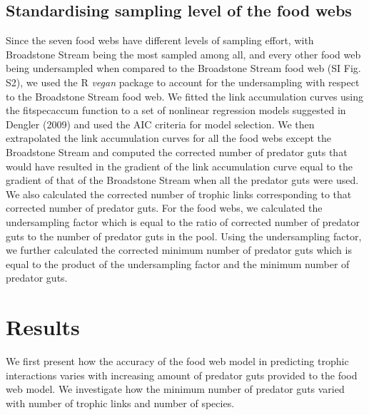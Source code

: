 \documentclass{article}
\begin{document}
\hypertarget{standardising-sampling-level-of-the-food-webs}{%
\subsection{Standardising sampling level of the food
webs}\label{standardising-sampling-level-of-the-food-webs}}

Since the seven food webs have different levels of sampling effort, with
Broadstone Stream being the most sampled among all, and every other food
web being undersampled when compared to the Broadstone Stream food web
(SI Fig. S2), we used the R \emph{vegan} package to account for the
undersampling with respect to the Broadstone Stream food web. We fitted
the link accumulation curves using the fitspecaccum function to a set of
nonlinear regression models suggested in Dengler (2009) and used the AIC
criteria for model selection. We then extrapolated the link accumulation
curves for all the food webs except the Broadstone Stream and computed
the corrected number of predator guts that would have resulted in the
gradient of the link accumulation curve equal to the gradient of that of
the Broadstone Stream when all the predator guts were used. We also
calculated the corrected number of trophic links corresponding to that
corrected number of predator guts. For the food webs, we calculated the
undersampling factor which is equal to the ratio of corrected number of
predator guts to the number of predator guts in the pool. Using the
undersampling factor, we further calculated the corrected minimum number
of predator guts which is equal to the product of the undersampling
factor and the minimum number of predator guts.

\hypertarget{results}{%
\section{Results}\label{results}}

We first present how the accuracy of the food web model in predicting
trophic interactions varies with increasing amount of predator guts
provided to the food web model. We investigate how the minimum number of
predator guts varied with number of trophic links and number of species.
\end{document}
